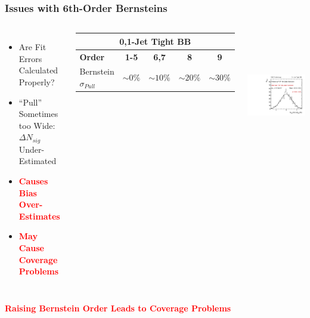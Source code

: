 \documentclass{beamer}
\newcommand{\tredbf}[1]{\textcolor{red}{\bf #1}}
\begin{document}
\begin{frame}
\frametitle{Issues with 6th-Order Bernsteins}
\begin{columns}[c]
 \column{60mm}
  \small
  \begin{itemize}
    \item Are Fit Errors Calculated Properly?
    \item ``Pull'' Sometimes too Wide: \\$\Delta N_{sig}$ Under-Estimated
    \item \tredbf{Causes Bias Over-Estimates}
    \item \tredbf{May Cause Coverage Problems}
  \end{itemize}
  \begin{center}
    \tiny
    \begin{tabular}{|l|c|c|c|c|} \hline 
    \multicolumn{5}{|c|}{\bf 0,1-Jet Tight BB} \\ \hline
    \bf Order &  \bf 1-5 &\bf  6,7 &\bf  8 &\bf  9 \\ \hline
    Bernstein $\sigma_{Pull}$ & $\sim0\%$ & $\sim10\%$ & $\sim20\%$ & $\sim30\%$ \\ \hline
    \end{tabular}
  \end{center}
 \column{60mm}
    \begin{center}
      \includegraphics[height=55mm]{redoWholeRange/biasStudy/bias_Jets01PassPtG10BB_115_Z_RefBernstein_Alt6Bernstein.pdf}
    \end{center}
\end{columns}
\begin{center}
  \large
  \tredbf{
  Raising Bernstein Order Leads to Coverage Problems
  }
\end{center}
\end{frame}
\end{document}
